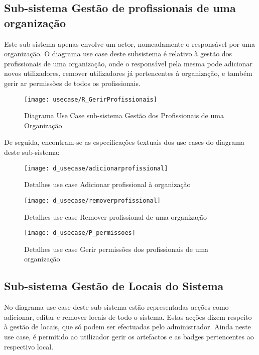 \documentclass[12pt,a4paper]{article}
\begin{document}
\subsection{Sub-sistema Gestão de profissionais de uma organização}
Este sub-sistema apenas envolve um actor, nomeadamente o responsável por uma organização. O diagrama
use case deste subsistema é relativo à gestão dos profissionais de uma organização, onde o responsável pela mesma pode adicionar novos utilizadores, remover utilizadores já pertencentes à organização, e também gerir ar permissões de todos os profissionais.\\

\begin{figure}[h!]
\centering
\texttt{[image: usecase/R\_GerirProfissionais]}
\label{usecase}
\caption{Diagrama Use Case sub-sistema Gestão dos Profissionais de uma Organização}
\end{figure}

De seguida, encontram-se as especificações textuais dos use cases do diagrama deste sub-sistema:\\

\begin{figure}[h!]
\centering
\texttt{[image: d\_usecase/adicionarprofissional]}
\label{usecase}
\caption{Detalhes use case Adicionar profissional à organização}
\end{figure}



\begin{figure}[h!]
\centering
\texttt{[image: d\_usecase/removerprofissional]}
\label{usecase}
\caption{Detalhes use case Remover profissional de uma organização}
\end{figure}

\begin{figure}[h!]
\centering
\texttt{[image: d\_usecase/P\_permissoes]}
\label{usecase}
\caption{Detalhes use case Gerir permissões dos profissionais de uma organização}
\end{figure}

\clearpage

\subsection{Sub-sistema Gestão de Locais do Sistema}
No diagrama use case deste sub-sistema estão representadas acções como adicionar, editar e remover locais de todo o sistema. Estas acções dizem respeito à gestão de locais, que só podem ser efectuadas pelo administrador. Ainda neste use case, é permitido ao utilizador gerir os artefactos e as badges pertencentes ao respectivo local.\\
\end{document}
